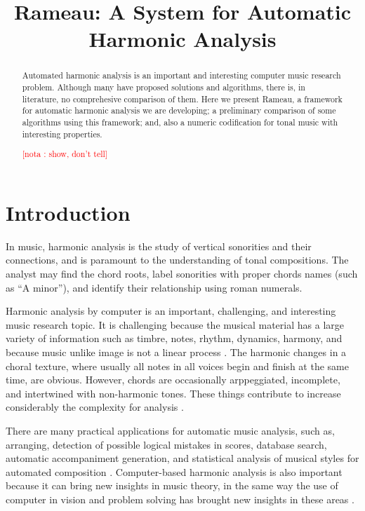\documentclass{article}
\title{Rameau: A System for Automatic Harmonic Analysis}
\newcounter{notacounter}
\newcommand{\nota}[1]{
  \addtocounter{notacounter}{1}
  \textcolor{red}{[nota \arabic{notacounter}: #1]}
}
\begin{document}
\graphicspath{{figs/}{data/}}
\maketitle

\begin{abstract}

  Automated harmonic analysis is an important and interesting computer
  music research problem. Although many have proposed solutions and
  algorithms, there is, in literature, no comprehesive comparison of
  them. Here we present Rameau, a framework for automatic harmonic
  analysis we are developing; a preliminary comparison of some
  algorithms using this framework; and, also a numeric codification
  for tonal music with interesting properties. \nota{show, don't tell}

\end{abstract}

\section{Introduction}
\label{sec:introduction}

In music, harmonic analysis is the study of vertical sonorities and
their connections, and is paramount to the understanding of tonal
compositions. The analyst may find the chord roots, label
sonorities with proper chords names (such as ``A minor''), and
identify their relationship using roman numerals.

Harmonic analysis by computer is an important, challenging, and
interesting music research topic. It is challenging because the
musical material has a large variety of information such as timbre,
notes, rhythm, dynamics, harmony, and because music unlike image is not a
linear process \cite{mouton.ea:numeric}. The harmonic changes in a choral
texture, where usually all notes in all voices begin and finish at the
same time, are obvious. However, chords are occasionally arppeggiated,
incomplete, and intertwined with non-harmonic tones. These things
contribute to increase considerably the complexity for analysis
\cite{pardo.ea:automated}.

There are many practical applications for automatic music analysis,
such as, arranging, detection of possible logical mistakes in scores,
database search, automatic accompaniment generation, and statistical
analysis of musical styles for automated composition
\cite{pardo.ea:algorithms,temperley.ea:modeling}. Computer-based
harmonic analysis is also important because it can bring new insights
in music theory, in the same way the use of computer in vision and
problem solving has brought new insights in these areas
\cite{temperley.ea:modeling}.
\end{document}
